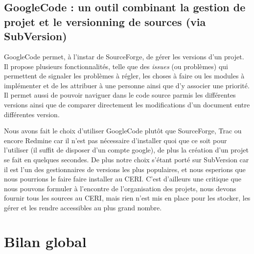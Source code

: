\documentclass[10pt,a4paper]{article}
\begin{document}
\subsection{GoogleCode : un outil combinant la gestion de projet et le versionning de sources (via SubVersion)}
\par GoogleCode permet, à l'instar de SourceForge, de gérer les versions d'un projet. Il propose plusieurs fonctionnalités, telle que des \textit{issues} (ou problèmes) qui permettent de signaler les problèmes à régler, les choses à faire ou les modules à implémenter et de les attribuer à une personne ainsi que d'y associer une priorité. Il permet aussi de pouvoir naviguer dans le code source parmis les différentes versions ainsi que de comparer directement les modifications d'un document entre différentes version.
\par Nous avons fait le choix d'utiliser GoogleCode plutôt que SourceForge, Trac ou encore Redmine car il n'est pas nécessaire d'installer quoi que ce soit pour l'utiliser (il suffit de disposer d'un compte google), de plus la création d'un projet se fait en quelques secondes. De plus notre choix s'étant porté sur SubVersion car il est l'un des gestionnaires de versions les plus populaires, et nous esperions que nous pourrions le faire faire installer au CERI. C'est d'ailleurs une critique que nous pouvons formuler à l'encontre de l'organisation des projets, nous devons fournir tous les sources au CERI, mais rien n'est mis en place pour les stocker, les gérer et les rendre accessibles au plus grand nombre.


\section{Bilan global}
\end{document}
